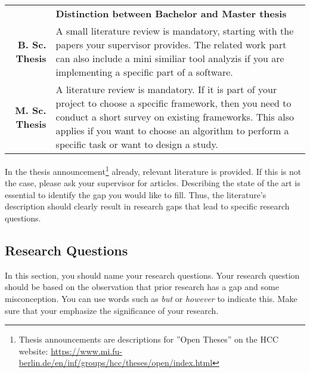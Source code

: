 \begin{table}[htb]
\small
\colorbox{bamacolor}{
\centering
\begin{tabularx}{\textwidth}{@{} r Y @{}}
	&
	\textbf{Distinction between Bachelor and Master thesis}\vspace{2mm}\\
    \textbf{B. Sc. Thesis} &
    A small literature review is mandatory, starting with the papers your supervisor provides. The related work part can also include a mini similiar tool analyzis if you are implementing a specific part of a software. \vspace{2mm}\\
	\textbf{M. Sc. Thesis} &
	A literature review is mandatory. If it is part of your project to choose a specific framework, then you need to conduct a short survey on existing frameworks. This also applies if you want to choose an algorithm to perform a specific task or want to design a study. \vspace{2mm}\\

\end{tabularx}
}
\end{table}

In the thesis announcement\footnote{Thesis announcements are descriptions for ''Open Theses'' on the HCC website: \url{https://www.mi.fu-berlin.de/en/inf/groups/hcc/theses/open/index.html}} already, relevant literature is provided. If this is not the case, please ask your supervisor for articles. Describing the state of the art is essential to identify the gap you would like to fill. Thus, the literature's description should clearly result in research gaps that lead to specific research questions. 


\subsection{Research Questions}
\label{subsec:question}
In this section, you should name your research questions. Your research question should be based on the observation that prior research has a gap and some misconception. You can use words such as \emph{but} or \emph{however} to indicate this. Make sure that your emphasize the significance of your research. 